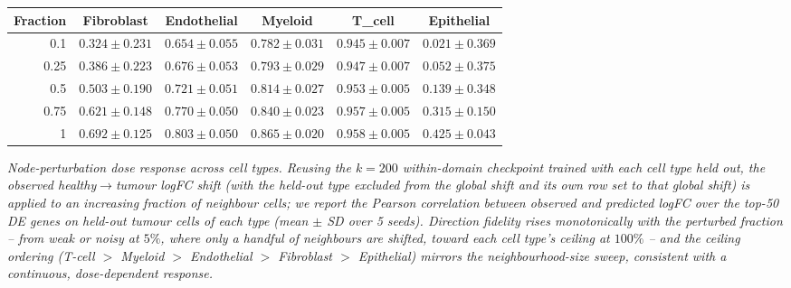 \begin{center}
\begin{tabular}{rccccc}
\toprule
Fraction & Fibroblast & Endothelial & Myeloid & T\_cell & Epithelial \\
\midrule
0.1 & $0.324 \pm 0.231$ & $0.654 \pm 0.055$ & $0.782 \pm 0.031$ & $0.945 \pm 0.007$ & $0.021 \pm 0.369$ \\
0.25 & $0.386 \pm 0.223$ & $0.676 \pm 0.053$ & $0.793 \pm 0.029$ & $0.947 \pm 0.007$ & $0.052 \pm 0.375$ \\
0.5 & $0.503 \pm 0.190$ & $0.721 \pm 0.051$ & $0.814 \pm 0.027$ & $0.953 \pm 0.005$ & $0.139 \pm 0.348$ \\
0.75 & $0.621 \pm 0.148$ & $0.770 \pm 0.050$ & $0.840 \pm 0.023$ & $0.957 \pm 0.005$ & $0.315 \pm 0.150$ \\
1 & $0.692 \pm 0.125$ & $0.803 \pm 0.050$ & $0.865 \pm 0.020$ & $0.958 \pm 0.005$ & $0.425 \pm 0.043$ \\
\bottomrule
\end{tabular}
\end{center}
\noindent\small\textit{Node-perturbation dose response across cell types. Reusing the $k=200$ within-domain checkpoint trained with each cell type held out, the observed healthy$\rightarrow$tumour logFC shift (with the held-out type excluded from the global shift and its own row set to that global shift) is applied to an increasing fraction of neighbour cells; we report the Pearson correlation between observed and predicted logFC over the top-50 DE genes on held-out tumour cells of each type (mean $\pm$ SD over 5 seeds). Direction fidelity rises monotonically with the perturbed fraction -- from weak or noisy at $5\%$, where only a handful of neighbours are shifted, toward each cell type's ceiling at $100\%$ -- and the ceiling ordering (T-cell $>$ Myeloid $>$ Endothelial $>$ Fibroblast $>$ Epithelial) mirrors the neighbourhood-size sweep, consistent with a continuous, dose-dependent response.}\normalsize

